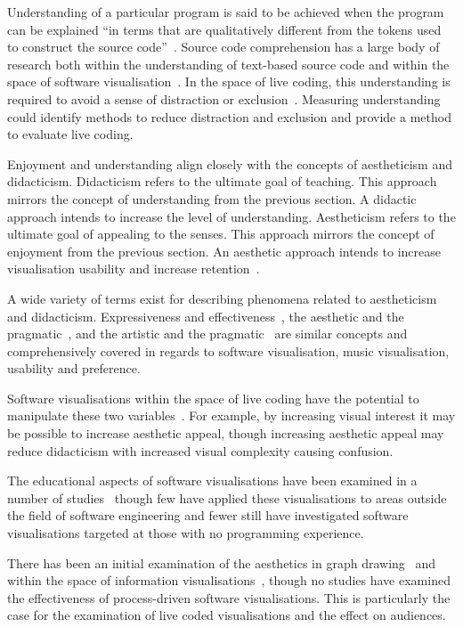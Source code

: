 Understanding of a particular program is said to be achieved when the program can be explained ``in terms that are qualitatively different from the tokens used to construct the source code''~\cite{Biggerstaff1994}. Source code comprehension has a large body of research both within the understanding of text-based source code and within the space of software visualisation~\cite{Hosking2005}. In the space of live coding, this understanding is required to avoid a sense of distraction or exclusion~\cite{McLean2010a}. Measuring understanding could identify methods to reduce distraction and exclusion and provide a method to evaluate live coding.

Enjoyment and understanding align closely with the concepts of aestheticism and didacticism. Didacticism refers to the ultimate goal of teaching. This approach mirrors the concept of understanding from the previous section. A didactic approach intends to increase the level of understanding. Aestheticism refers to the ultimate goal of appealing to the senses. This approach mirrors the concept of enjoyment from the previous section. An aesthetic approach intends to increase visualisation usability and increase retention~\cite{Cawthon2007}. 

A wide variety of terms exist for describing phenomena related to aestheticism and didacticism. Expressiveness and effectiveness~\cite{Hundhausen1996,Hundhausen2002}, the aesthetic and the pragmatic~\cite{Angeli2006}, and the artistic and the pragmatic~\cite{Kosara2007} are similar concepts and comprehensively covered in regards to software visualisation, music visualisation, usability and preference.

Software visualisations within the space of live coding have the potential to manipulate these two variables~\cite{Iru,McLean2010a}. For example, by increasing visual interest it may be possible to increase aesthetic appeal, though increasing aesthetic appeal may reduce didacticism with increased visual complexity causing confusion.

The educational aspects of software visualisations have been examined in a number of studies~\cite{Baecker1998,Hundhausen2007} though few have applied these visualisations to areas outside the field of software engineering and fewer still have investigated software visualisations targeted at those with no programming experience.

There has been an initial examination of the aesthetics in graph drawing~\cite{Purchase1996,Purchase2001} and within the space of information visualisations~\cite{Cawthon2007,Bell}, though no studies have examined the effectiveness of process-driven software visualisations. This is particularly the case for the examination of live coded visualisations and the effect on audiences.

